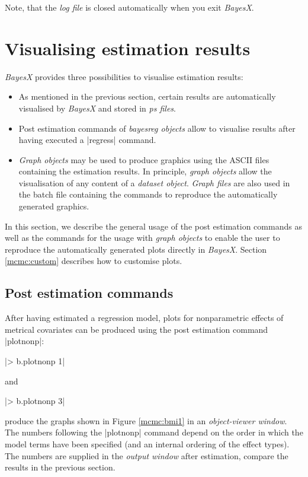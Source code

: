 Note, that the {\it log file} is closed automatically when you exit {\it BayesX}.

\section{Visualising estimation results}\label{mcmc:visual}

{\it BayesX} provides three possibilities to visualise estimation results:
\begin{itemize}
\item As mentioned in the previous section, certain results are automatically visualised by {\it BayesX} and stored in {\it
    ps files}.
\item Post estimation commands of {\it bayesreg objects} allow to visualise results after having executed a |regress|
    command.
\item {\it Graph objects} may be used to produce graphics using the ASCII files containing the estimation results. In
    principle, {\it graph objects} allow the visualisation of any content of a {\it dataset object}. {\it Graph files} are
    also used in the batch file containing the commands to reproduce the automatically generated graphics.
\end{itemize}

In this section, we describe the general usage of the post estimation commands as well as the commands for the usage with {\it
graph objects} to enable the user to reproduce the automatically generated plots directly in {\it BayesX}. Section
\ref{mcmc:custom} describes how to customise plots.

\subsection{Post estimation commands}

After having estimated a regression model, plots for nonparametric effects of metrical covariates can be produced using the
post estimation command |plotnonp|:

|> b.plotnonp 1|

and

|> b.plotnonp 3|

produce the graphs shown in Figure \ref{mcmc:bmi1} in an {\it object-viewer window}. The numbers following the |plotnonp|
command depend on the order in which the model terms have been specified (and an internal ordering of the effect types). The
numbers are supplied in the {\it output window} after estimation, compare the results in the previous section.

